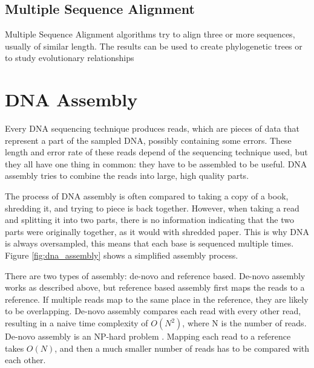 \documentclass[../main/thesis.tex]{subfiles}
\begin{document}
\subsection{Multiple Sequence Alignment}
Multiple Sequence Alignment algorithms \cite{MSA_survey} try to align three or more sequences, usually of similar length.
The results can be used to create phylogenetic trees or to study evolutionary relationships \cite{MSA}


\section{DNA Assembly}
Every DNA sequencing technique produces reads, which are pieces of data that represent a part of the sampled DNA, possibly containing some errors.
These length and error rate of these reads depend of the sequencing technique used, but they all have one thing in common: they have to be assembled to be useful.
DNA assembly tries to combine the reads into large, high quality parts.

The process of DNA assembly is often compared to taking a copy of a book, shredding it, and trying to piece is back together.
However, when taking a read and splitting it into two parts, there is no information indicating that the two parts were originally together, as it would with shredded paper.
This is why DNA is always oversampled, this means that each base is sequenced multiple times.
Figure \ref{fig:dna_assembly} shows a simplified assembly process.


There are two types of assembly: de-novo and reference based.
De-novo assembly works as described above, but reference based assembly first maps the reads to a reference.
If multiple reads map to the same place in the reference, they are likely to be overlapping.
De-novo assembly compares each read with every other read, resulting in a naive time complexity of $O(N^2)$, where N is the number of reads.
De-novo assembly is an NP-hard problem \cite{denovo_NP}.
Mapping each read to a reference takes $O(N)$, and then a much smaller number of reads has to be compared with each other.
\end{document}
